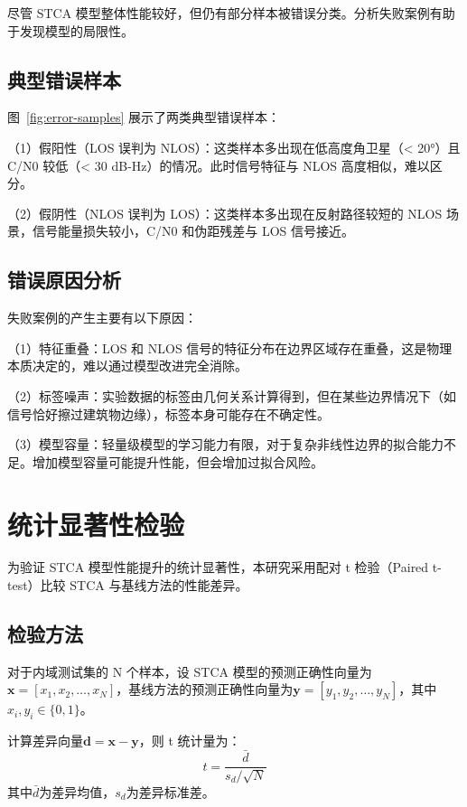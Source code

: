 尽管 STCA 模型整体性能较好，但仍有部分样本被错误分类。分析失败案例有助于发现模型的局限性。

\subsection{典型错误样本}

图~\ref{fig:error-samples} 展示了两类典型错误样本：

（1）假阳性（LOS 误判为 NLOS）：这类样本多出现在低高度角卫星（< 20°）且 C/N0 较低（< 30 dB-Hz）的情况。此时信号特征与 NLOS 高度相似，难以区分。

（2）假阴性（NLOS 误判为 LOS）：这类样本多出现在反射路径较短的 NLOS 场景，信号能量损失较小，C/N0 和伪距残差与 LOS 信号接近。

\subsection{错误原因分析}

失败案例的产生主要有以下原因：

（1）特征重叠：LOS 和 NLOS 信号的特征分布在边界区域存在重叠，这是物理本质决定的，难以通过模型改进完全消除。

（2）标签噪声：实验数据的标签由几何关系计算得到，但在某些边界情况下（如信号恰好擦过建筑物边缘），标签本身可能存在不确定性。

（3）模型容量：轻量级模型的学习能力有限，对于复杂非线性边界的拟合能力不足。增加模型容量可能提升性能，但会增加过拟合风险。

\section{统计显著性检验}

为验证 STCA 模型性能提升的统计显著性，本研究采用配对 t 检验（Paired t-test）比较 STCA 与基线方法的性能差异。

\subsection{检验方法}

对于内域测试集的 N 个样本，设 STCA 模型的预测正确性向量为$\bm{x} = [x_1, x_2, \ldots, x_N]$，基线方法的预测正确性向量为$\bm{y} = [y_1, y_2, \ldots, y_N]$，其中$x_i, y_i \in \{0, 1\}$。

计算差异向量$\bm{d} = \bm{x} - \bm{y}$，则 t 统计量为：
\begin{equation}
t = \frac{\bar{d}}{s_d / \sqrt{N}}
\end{equation}
其中$\bar{d}$为差异均值，$s_d$为差异标准差。

